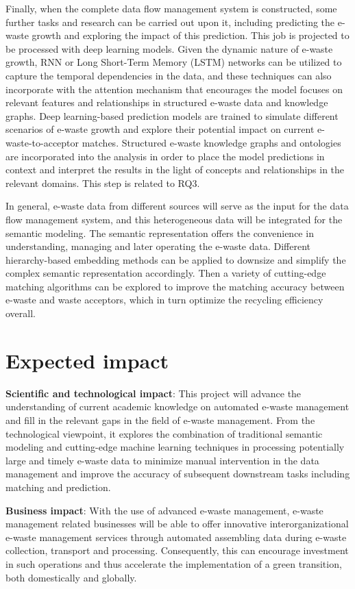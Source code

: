 \documentclass{article}
\numberwithin{equation}{section}
\begin{document}
Finally, when the complete data flow management system is constructed, some further tasks and research can be carried out upon it, including predicting the e-waste growth and exploring the impact of this prediction. This job is projected to be processed with deep learning models. Given the dynamic nature of e-waste growth, RNN or Long Short-Term Memory (LSTM)\cite{lipt15} networks can be utilized to capture the temporal dependencies in the data, and these techniques can also incorporate with the attention mechanism that encourages the model focuses on relevant features and relationships in structured e-waste data and knowledge graphs. Deep learning-based prediction models are trained to simulate different scenarios of e-waste growth and explore their potential impact on current e-waste-to-acceptor matches. Structured e-waste knowledge graphs and ontologies are incorporated into the analysis in order to place the model predictions in context and interpret the results in the light of concepts and relationships in the relevant domains. This step is related to RQ3.

In general, e-waste data from different sources will serve as the input for the data flow management system, and this heterogeneous data will be integrated for the semantic modeling. The semantic representation offers the convenience in understanding, managing and later operating the e-waste data. Different hierarchy-based embedding methods can be applied to downsize and simplify the complex semantic representation accordingly. Then a variety of cutting-edge matching algorithms can be explored to improve the matching accuracy between e-waste and waste acceptors, which in turn optimize the recycling efficiency overall.

\section{Expected impact}
\textbf{Scientific and technological impact}: This project will advance the understanding of current academic knowledge on automated e-waste management and fill in the relevant gaps in the field of e-waste management. From the technological viewpoint, it explores the combination of traditional semantic modeling and cutting-edge machine learning techniques in processing potentially large and timely e-waste data to minimize manual intervention in the data management and improve the accuracy of subsequent downstream tasks including matching and prediction.

\textbf{Business impact}: With the use of advanced e-waste management,  e-waste management related businesses will be able to offer innovative interorganizational e-waste management services through automated assembling data during e-waste collection, transport and processing. Consequently, this can encourage investment in such operations and thus accelerate the implementation of a green transition, both domestically and globally.
\end{document}
